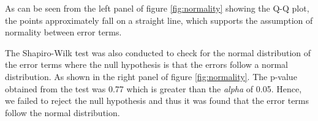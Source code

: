 As can be seen from the left panel of figure \ref{fig:normality} showing the Q-Q plot, the points approximately fall on a straight line, which supports the assumption of normality between error terms.


The Shapiro-Wilk test was also conducted to check for the normal distribution of the error terms where the null hypothesis is that the errors follow a normal distribution. As shown in the right panel of  figure \ref{fig:normality}. The p-value obtained from the test was 0.77 which is greater than the \textit{alpha} of 0.05. Hence, we failed to reject the null hypothesis and thus it was found that the error terms follow the normal distribution. 




